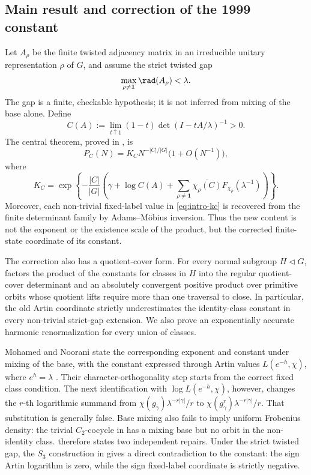 \subsection{Main result and correction of the 1999 constant}

Let \(A_\rho\) be the finite twisted adjacency matrix in an irreducible
unitary representation \(\rho\) of \(G\), and assume the strict twisted gap
\[
  \max_{\rho\neq\mathbf1}\rad(A_\rho)<\lambda.
\]
The gap is a finite, checkable hypothesis; it is not inferred from mixing of
the base alone.  Define
\[
  C(A):=\lim_{t\uparrow1}(1-t)\det(I-tA/\lambda)^{-1}>0.
\]
The central theorem, proved in , is
\begin{equation}\label{eq:intro-main-constant}
  P_C(N)=K_C N^{-|C|/|G|}\bigl(1+O(N^{-1})\bigr),
\end{equation}
where
\begin{equation}\label{eq:intro-kc}
  K_C=
  \exp\!\left\{-\frac{|C|}{|G|}
    \left(\gamma+\log C(A)
      +\sum_{\rho\neq\mathbf1}
        \overline{\chi_\rho(C)}F_{\chi_\rho}(\lambda^{-1})
    \right)\right\}.
\end{equation}
Moreover, each non-trivial fixed-label value in \eqref{eq:intro-kc} is
recovered from the finite determinant family by Adams--M\"obius inversion.
Thus the new content is not the exponent or the existence scale of the
product, but the corrected finite-state coordinate of its constant.

The correction also has a quotient-cover form.  For every normal subgroup
\(H\triangleleft G\),  factors the product
of the constants for classes in \(H\) into the regular quotient-cover
determinant and an absolutely convergent positive product over primitive
orbits whose quotient lifts require more than one traversal to close.  In
particular, the old Artin coordinate strictly underestimates the
identity-class constant in every non-trivial strict-gap extension.  We also
prove an exponentially accurate harmonic renormalization for every union of
classes.

Mohamed and Noorani state the corresponding exponent and constant under
mixing of the base, with the constant expressed through Artin values
\(L(e^{-h},\chi)\), where \(e^h=\lambda\)
\cite[Theorem~1 and its proof on pp.~124--125]{MeslizaNoorani1999FrobeniusMertens}.
Their character-orthogonality step starts from the correct fixed class
condition.  The next identification with \(\log L(e^{-h},\chi)\), however,
changes the \(r\)-th logarithmic summand from
\(\chi(g_\gamma)\lambda^{-r|\gamma|}/r\) to
\(\chi(g_\gamma^r)\lambda^{-r|\gamma|}/r\).  That substitution is generally
false.  Base mixing also fails to imply uniform Frobenius density: the trivial
\(C_2\)-cocycle in  has a mixing base
but no orbit in the non-identity class.   therefore
states two independent repairs.  Under the strict twisted gap, the \(S_3\)
construction in  gives a direct contradiction to the
constant: the sign Artin logarithm is zero, while the sign fixed-label
coordinate is strictly negative.

